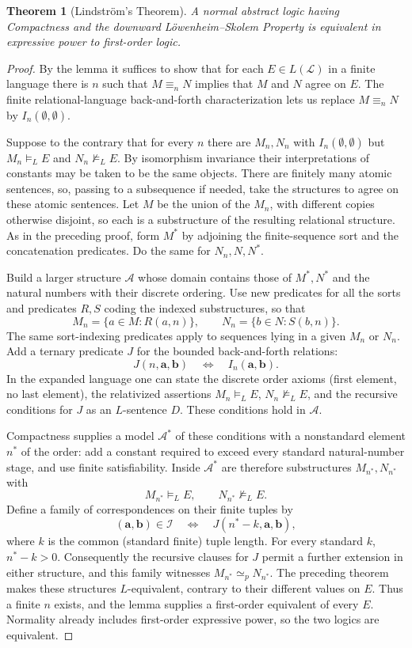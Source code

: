 \documentclass[UTF8,11pt]{ctexart}
\newtheorem*{theorem}{Theorem}
\theoremstyle{definition}
\begin{document}
\begin{theorem}[Lindstr\"om's Theorem]
A normal abstract logic having Compactness and the downward
L\"owenheim--Skolem Property is equivalent in expressive power to
first-order logic.
\end{theorem}
\begin{proof}
By the lemma it suffices to show that for each $E\in L(\mathcal L)$
in a finite language there is $n$ such that $M\equiv_nN$ implies that
$M$ and $N$ agree on $E$. The finite relational-language back-and-forth
characterization lets us replace $M\equiv_nN$ by
$I_n(\emptyset,\emptyset)$.

Suppose to the contrary that for every $n$ there are $M_n,N_n$ with
$I_n(\emptyset,\emptyset)$ but $M_n\models_LE$ and
$N_n\not\models_LE$. By isomorphism invariance their interpretations
of constants may be taken to be the same objects. There are finitely
many atomic sentences, so, passing to a subsequence if needed, take
the structures to agree on these atomic sentences.
Let $M$ be the union of the $M_n$, with different copies otherwise
disjoint, so each is a substructure of the resulting relational
structure. As in the preceding proof, form $M^*$ by adjoining the
finite-sequence sort and the concatenation predicates. Do the same for
$N_n,N,N^*$.

Build a larger structure $\mathcal A$ whose domain contains those of
$M^*,N^*$ and the natural numbers with their discrete ordering.
Use new predicates for all the sorts and predicates $R,S$ coding the
indexed substructures, so that
\[
M_n=\{a\in M:R(a,n)\},\qquad
N_n=\{b\in N:S(b,n)\}.
\]
The same sort-indexing predicates apply to sequences lying in a given
$M_n$ or $N_n$. Add a ternary predicate $J$ for the bounded
back-and-forth relations:
\[
J(n,\mathbf a,\mathbf b)\quad\Longleftrightarrow\quad
I_n(\mathbf a,\mathbf b).
\]
In the expanded language one can state the discrete order axioms
(first element, no last element), the relativized assertions
$M_n\models_LE$, $N_n\not\models_LE$, and the recursive conditions
for $J$ as an $L$-sentence $D$. These conditions hold in $\mathcal A$.

Compactness supplies a model $\mathcal A^*$ of these conditions with a
nonstandard element $n^*$ of the order: add a constant required to
exceed every standard natural-number stage, and use finite satisfiability.
Inside $\mathcal A^*$ are therefore substructures
$M_{n^*},N_{n^*}$ with
\[
M_{n^*}\models_LE,\qquad N_{n^*}\not\models_LE.
\]
Define a family of correspondences on their finite tuples by
\[
(\mathbf a,\mathbf b)\in\mathcal I
\quad\Longleftrightarrow\quad
J(n^*-k,\mathbf a,\mathbf b),
\]
where $k$ is the common (standard finite) tuple length.
For every standard $k$, $n^*-k>0$. Consequently the recursive clauses
for $J$ permit a further extension in either structure, and this family
witnesses $M_{n^*}\simeq_pN_{n^*}$.
The preceding theorem makes these structures $L$-equivalent, contrary
to their different values on $E$. Thus a finite $n$ exists, and the
lemma supplies a first-order equivalent of every $E$.
Normality already includes first-order expressive power, so the two
logics are equivalent.
\end{proof}
\end{document}
